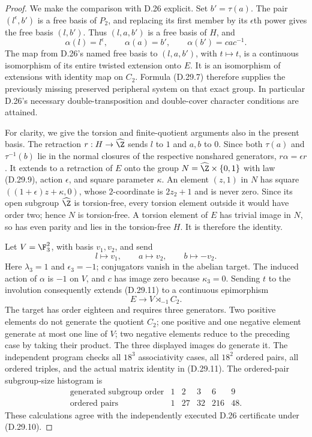 \begin{proof}
We make the comparison with D.26 explicit.  Set
$b'=\tau(a)$.  The pair $(l^\epsilon,b')$ is a free basis
of $P_2$, and replacing its first member by its
$\epsilon$th power gives the free basis $(l,b')$.
Thus $(l,a,b')$ is a free basis of $H$, and
\[
 \alpha(l)=l^\epsilon,\qquad
 \alpha(a)=b',\qquad
 \alpha(b')=c a c^{-1}.                               \tag{D.29.10}
\]
The map from D.26's named free basis to $(l,a,b')$, with
$t\mapsto t$, is a continuous isomorphism of its entire
twisted extension onto $E$.  It is an isomorphism of
extensions with identity map on $C_2$.  Formula (D.29.7)
therefore supplies the previously missing preserved
peripheral system on that exact group.  In particular
D.26's necessary double-transposition and double-cover
character conditions are attained.

For clarity, we give the torsion and finite-quotient
arguments also in the present basis.  The retraction
$r:H\to\widehat\Z$ sends $l$ to $1$ and $a,b$ to $0$.
Since both $\tau(a)$ and $\tau^{-1}(b)$ lie in the
normal closures of the respective nonshared generators,
$r\alpha=\epsilon r$.  It extends to a retraction of
$E$ onto the group $N=\widehat\Z\times\{0,1\}$ with law
(D.29.9), action $\epsilon$, and square parameter
$\kappa$.  An element $(z,1)$ in $N$ has square
$((1+\epsilon)z+\kappa,0)$, whose $2$-coordinate is
$2z_2+1$ and is never zero.  Since its open subgroup
$\widehat\Z$ is torsion-free, every torsion element
outside it would have order two; hence $N$ is torsion-free.
A torsion element of $E$ has trivial image in $N$, so
has even parity and lies in the torsion-free $H$.
It is therefore the identity.

Let $V=\F_3^2$, with basis $v_1,v_2$, and send
\[
         l\longmapsto v_1,\qquad
         a\longmapsto v_2,\qquad
         b\longmapsto -v_2.
                                                        \tag{D.29.11}
\]
Here $\lambda_3=1$ and $\epsilon_3=-1$; conjugators
vanish in the abelian target.  The induced action of
$\alpha$ is $-1$ on $V$, and $c$ has image zero because
$\kappa_3=0$.  Sending $t$ to the involution consequently
extends (D.29.11) to a continuous epimorphism
\[
              E\longrightarrow V\rtimes_{-1}C_2.      \tag{D.29.12}
\]
The target has order eighteen and requires three
generators.  Two positive elements do not generate the
quotient $C_2$; one positive and one negative element
generate at most one line of $V$; two negative elements
reduce to the preceding case by taking their product.
The three displayed images do generate it.
The independent program
 checks all
$18^3$ associativity cases, all $18^2$ ordered pairs,
all ordered triples, and the actual matrix identity in
(D.29.11).  The ordered-pair subgroup-size histogram is
\[
 \begin{array}{c|rrrrr}
 \text{generated subgroup order}&1&2&3&6&9\\\hline
 \text{ordered pairs}&1&27&32&216&48.
 \end{array}                                          \tag{D.29.13}
\]
These calculations agree with the independently executed
D.26 certificate under (D.29.10).


\end{proof}

